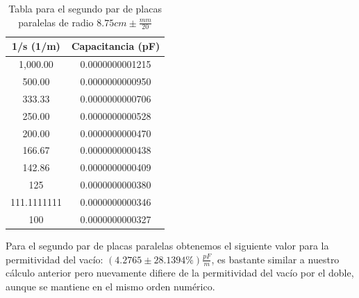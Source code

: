 \documentclass[article,12pt]{elsarticle}
\begin{document}
\begin{table}[H]
\centering
\begin{tabular}{|c|c|}
\hline
\rowcolor[HTML]{C0C0C0} 
\textbf{1/s (1/m)}                 & \textbf{Capacitancia (pF)}              \\ \hline
\rowcolor[HTML]{FFFFFF} 
{\color[HTML]{000000} 1,000.00}    & {\color[HTML]{000000} 0.0000000001215} \\ \hline
\rowcolor[HTML]{FFFFFF} 
{\color[HTML]{000000} 500.00}      & {\color[HTML]{000000} 0.0000000000950} \\ \hline
\rowcolor[HTML]{FFFFFF} 
{\color[HTML]{000000} 333.33}      & {\color[HTML]{000000} 0.0000000000706} \\ \hline
\rowcolor[HTML]{FFFFFF} 
{\color[HTML]{000000} 250.00}      & {\color[HTML]{000000} 0.0000000000528} \\ \hline
\rowcolor[HTML]{FFFFFF} 
{\color[HTML]{000000} 200.00}      & {\color[HTML]{000000} 0.0000000000470} \\ \hline
\rowcolor[HTML]{FFFFFF} 
{\color[HTML]{000000} 166.67}      & {\color[HTML]{000000} 0.0000000000438} \\ \hline
\rowcolor[HTML]{FFFFFF} 
{\color[HTML]{000000} 142.86}      & {\color[HTML]{000000} 0.0000000000409} \\ \hline
\rowcolor[HTML]{FFFFFF} 
{\color[HTML]{000000} 125}         & {\color[HTML]{000000} 0.0000000000380} \\ \hline
\rowcolor[HTML]{FFFFFF} 
{\color[HTML]{000000} 111.1111111} & {\color[HTML]{000000} 0.0000000000346} \\ \hline
\rowcolor[HTML]{FFFFFF} 
{\color[HTML]{000000} 100}         & {\color[HTML]{000000} 0.0000000000327} \\ \hline
\end{tabular}
\caption{Tabla para el segundo par de placas paralelas de radio $8.75cm \pm \frac{mm}{20}$}
\end{table}

Para el segundo par de placas paralelas obtenemos el siguiente valor para la permitividad del vacío: $(4.2765 \pm 28.1394\%)\frac{pF}{m}$, es bastante similar a nuestro cálculo anterior pero nuevamente difiere de la permitividad del vacío por el doble, aunque se mantiene en el mismo orden numérico.
\end{document}
